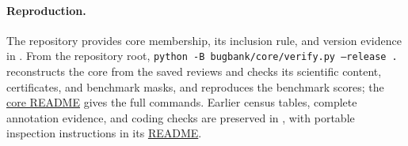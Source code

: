 \paragraph{Reproduction.}
The repository provides core membership, its inclusion rule, and version evidence in . From the repository root, \texttt{python -B bugbank/core/verify.py --release .} reconstructs the core from the saved reviews and checks its scientific content, certificates, and benchmark masks, and  reproduces the benchmark scores; the \href{https://github.com/qqliu/CoPEER/blob/main/bugbank/core/README.md}{core README} gives the full commands. Earlier census tables, complete annotation evidence, and coding checks are preserved in , with portable inspection instructions in its \href{https://github.com/qqliu/CoPEER/blob/main/bugbank/annotations/README.md}{README}.
